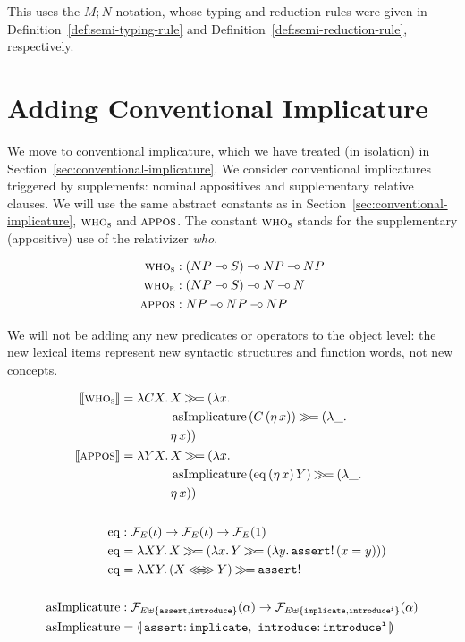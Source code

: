 This uses the $M; N$ notation, whose typing and reduction rules were given
in Definition~\ref{def:semi-typing-rule} and
Definition~\ref{def:semi-reduction-rule}, respectively.


\section{Adding Conventional Implicature}
\label{sec:adding-conventional-implicature}

We move to conventional implicature, which we have treated (in isolation)
in Section~\ref{sec:conventional-implicature}. We consider conventional
implicatures triggered by supplements: nominal appositives and
supplementary relative clauses. We will use the same abstract constants as
in Section~\ref{sec:conventional-implicature}, $\textsc{who}_{\textsc{s}}$ and
$\textsc{appos}$. The constant $\textsc{who}_{\textsc{s}}$ stands for the
supplementary (appositive) use of the relativizer \emph{who}.

\begin{align*}
  \textsc{who}_{\textsc{s}} &: (NP \mathbin{{-}\mkern-3.5mu{\circ}} S) \mathbin{{-}\mkern-3.5mu{\circ}} NP \mathbin{{-}\mkern-3.5mu{\circ}} NP \\
  \textsc{who}_{\textsc{r}} &: (NP \mathbin{{-}\mkern-3.5mu{\circ}} S) \mathbin{{-}\mkern-3.5mu{\circ}} N \mathbin{{-}\mkern-3.5mu{\circ}} N \\
  \textsc{appos} &: NP \mathbin{{-}\mkern-3.5mu{\circ}} NP \mathbin{{-}\mkern-3.5mu{\circ}} NP
\end{align*}

We will not be adding any new predicates or operators to the object level:
the new lexical items represent new syntactic structures and function
words, not new concepts.

\begin{align*}
  \sem{\abs{who}_{\abs{s}}} &= \lam{C X}{\begin{aligned}[t]
      &X \hsbind (\lam{x}{ \\
      &\ap{\asImplicature}{(\ap{C}{(\etaE{x})})} \hsbind (\lam{\_}{ \\
      &\etaE{x}})})
    \end{aligned}} \\
  \lex{appos}{\lam{Y X}{\begin{aligned}[t]
      &X \hsbind (\lam{x}{ \\
      &\ap{\asImplicature}{(\app{\eq}{(\etaE{x})}{Y})} \hsbind (\lam{\_}{ \\
      &\etaE{x}})})
    \end{aligned}}} \\
  \\
  \eq &: \FF_E(\iota) \to \FF_E(\iota) \to \FF_E(1) \\
  \eq &= \lam{X Y}{X \hsbind (\lam{x}{Y \hsbind (\lam{y}{\ap{\op{assert}!}{(x = y)}})})} \\
  \eq &= \lam{X Y}{(X \eqlr Y) \hsbind \op{assert}!} \\
  \\
  \asImplicature &: \FF_{E \uplus \{\op{assert},\op{introduce}\}}(\alpha) \to
                    \FF_{E \uplus \{\op{implicate},\op{introduce^i}\}}(\alpha) \\
  \asImplicature &= \banana{\onto{\op{assert}}{\op{implicate}},\
                            \onto{\op{introduce}}{\op{introduce^i}}}
\end{align*}

